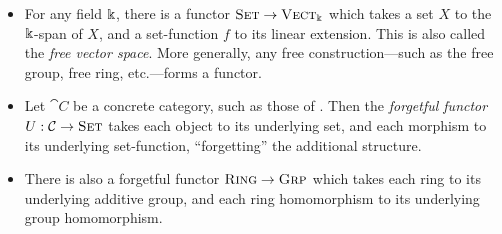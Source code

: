 \begin{ex}
\begin{itemize}
    \item For any field $\Bbbk$, there is a functor ${\textsc{\text{Set}}}\to{\textsc{\text{Vect}}}_\Bbbk$ which
      takes a set $X$ to the $\Bbbk$-span of $X$, and a set-function $f$ to
      its linear extension. This is also called the \emph{free vector space}.
      More generally, any free construction---such as the free group, free ring,
      etc.---forms a functor.
    \item Let $\cat{C}$ be a concrete category, such as those of
      . Then
      the \emph{forgetful functor} $U: {\mathcal{C}}\to{\textsc{\text{Set}}}$ takes each object
      to its underlying set, and each morphism to its underlying set-function,
      ``forgetting'' the additional structure.
    \item There is also a forgetful functor ${\textsc{\text{Ring}}}\to{\textsc{\text{Grp}}}$ which
      takes each ring to its underlying additive group, and each ring
      homomorphism to its underlying group homomorphism.
  \end{itemize}
\end{ex}

